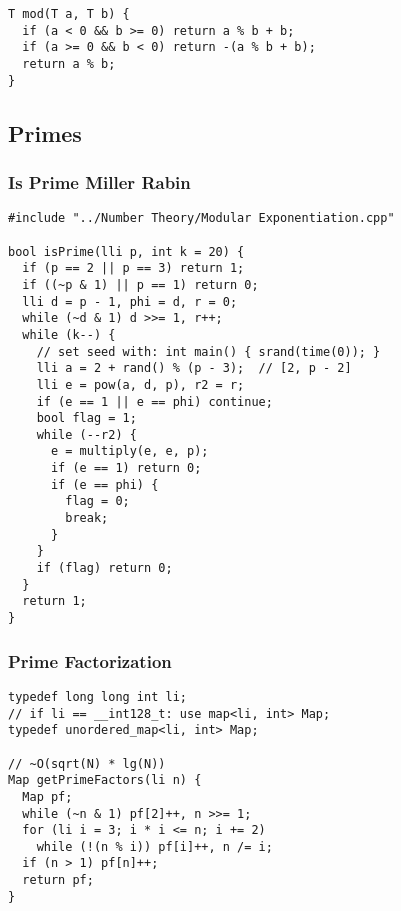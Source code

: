 \documentclass[twoside]{article}
\begin{document}
\begin{multicols*}{2}
\begin{verbatim}
T mod(T a, T b) {
  if (a < 0 && b >= 0) return a % b + b;
  if (a >= 0 && b < 0) return -(a % b + b);
  return a % b;
}
\end{verbatim}

\subsectionfont{\bfseries\sffamily\centering\LARGE}
\vspace{0em}
\subsection*{Primes}
\vspace{2em}
\subsubsectionfont{\large\bfseries\sffamily\underline}
\subsubsection*{Is Prime Miller Rabin}
\begin{verbatim}
#include "../Number Theory/Modular Exponentiation.cpp"

bool isPrime(lli p, int k = 20) {
  if (p == 2 || p == 3) return 1;
  if ((~p & 1) || p == 1) return 0;
  lli d = p - 1, phi = d, r = 0;
  while (~d & 1) d >>= 1, r++;
  while (k--) {
    // set seed with: int main() { srand(time(0)); }
    lli a = 2 + rand() % (p - 3);  // [2, p - 2]
    lli e = pow(a, d, p), r2 = r;
    if (e == 1 || e == phi) continue;
    bool flag = 1;
    while (--r2) {
      e = multiply(e, e, p);
      if (e == 1) return 0;
      if (e == phi) {
        flag = 0;
        break;
      }
    }
    if (flag) return 0;
  }
  return 1;
}
\end{verbatim}

\subsubsectionfont{\large\bfseries\sffamily\underline}
\subsubsection*{Prime Factorization}
\begin{verbatim}
typedef long long int li;
// if li == __int128_t: use map<li, int> Map;
typedef unordered_map<li, int> Map;

// ~O(sqrt(N) * lg(N))
Map getPrimeFactors(li n) {
  Map pf;
  while (~n & 1) pf[2]++, n >>= 1;
  for (li i = 3; i * i <= n; i += 2)
    while (!(n % i)) pf[i]++, n /= i;
  if (n > 1) pf[n]++;
  return pf;
}
\end{verbatim}


\end{multicols*}
\end{document}
